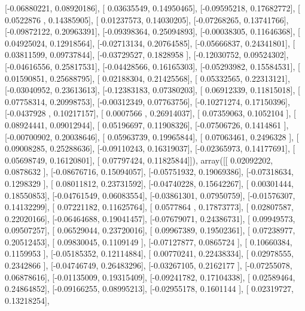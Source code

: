 \documentclass{article}
\begin{document}
       [-0.06880221,  0.08920186],
       [ 0.03635549,  0.14950465],
       [-0.09595218,  0.17682772],
       [ 0.0522876 ,  0.14385905],
       [ 0.01237573,  0.14030205],
       [-0.07268265,  0.13741766],
       [-0.09872122,  0.20963391],
       [-0.09398364,  0.25094893],
       [-0.00038305,  0.11646368],
       [ 0.04925024,  0.12918564],
       [-0.02713134,  0.20764585],
       [-0.05666837,  0.24341801],
       [ 0.03811599,  0.09737844],
       [-0.03729527,  0.1828958 ],
       [-0.12030752,  0.09524302],
       [-0.04616556,  0.25817531],
       [-0.04428566,  0.16165303],
       [-0.05293982,  0.15584531],
       [ 0.01590851,  0.25688795],
       [ 0.02188304,  0.21425568],
       [ 0.05332565,  0.22313121],
       [-0.03040952,  0.23613613],
       [-0.12383183,  0.07380203],
       [ 0.06912339,  0.11815018],
       [ 0.07758314,  0.20998753],
       [-0.00312349,  0.07763756],
       [-0.10271274,  0.17150396],
       [-0.0437928 ,  0.10217157],
       [ 0.0007566 ,  0.26914037],
       [ 0.07359063,  0.1052104 ],
       [ 0.08924441,  0.09012944],
       [ 0.05196697,  0.11908326],
       [-0.07506726,  0.1414861 ],
       [-0.00700902,  0.20038646],
       [ 0.05963739,  0.19965844],
       [ 0.07063461,  0.2496328 ],
       [ 0.09008285,  0.25288636],
       [-0.09110243,  0.16319037],
       [-0.02365973,  0.14177691],
       [ 0.05698749,  0.16120801],
       [ 0.07797424,  0.11825844]]), array([[ 0.02092202,  0.0878632 ],
       [-0.08676716,  0.15094057],
       [-0.05751932,  0.19069386],
       [-0.07318634,  0.1298329 ],
       [ 0.08011812,  0.23731592],
       [-0.04740228,  0.15642267],
       [ 0.00301444,  0.18550853],
       [-0.04761549,  0.06083554],
       [-0.03861301,  0.07950759],
       [-0.01576307,  0.14132299],
       [ 0.07221182,  0.11625764],
       [ 0.0577864 ,  0.17873773],
       [ 0.02807587,  0.22020166],
       [-0.06464688,  0.19041457],
       [-0.07679071,  0.24386731],
       [ 0.09949573,  0.09507257],
       [ 0.06529044,  0.23720016],
       [ 0.09967389,  0.19502361],
       [ 0.07238977,  0.20512453],
       [ 0.09830045,  0.1109149 ],
       [-0.07127877,  0.0865724 ],
       [ 0.10660384,  0.1159953 ],
       [-0.05185352,  0.12114884],
       [ 0.00770241,  0.22438334],
       [ 0.02978555,  0.2342866 ],
       [-0.04746749,  0.26483296],
       [-0.03267105,  0.2162177 ],
       [-0.07255078,  0.06878616],
       [-0.01135009,  0.19315409],
       [-0.09241782,  0.17104338],
       [ 0.02589464,  0.24864852],
       [-0.09166255,  0.08995213],
       [-0.02955178,  0.1601144 ],
       [ 0.02319727,  0.13218254],
\end{document}
